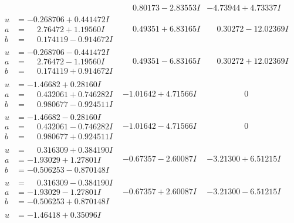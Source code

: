 \documentclass[1p]{elsarticle_modified}
\theoremstyle{definition}
\begin{document}
$$\begin{array}{c|c|c}
 & \phantom{-}0.80173 - 2.83553 I & -4.73944 + 4.73337 I \\ \hline\begin{aligned}
u &= -0.268706 + 0.441472 I \\
a &= \phantom{-}2.76472 + 1.19560 I \\
b &= \phantom{-}0.174119 - 0.914672 I\end{aligned}
 & \phantom{-}0.49351 + 6.83165 I & \phantom{-}0.30272 - 12.02369 I \\ \hline\begin{aligned}
u &= -0.268706 - 0.441472 I \\
a &= \phantom{-}2.76472 - 1.19560 I \\
b &= \phantom{-}0.174119 + 0.914672 I\end{aligned}
 & \phantom{-}0.49351 - 6.83165 I & \phantom{-}0.30272 + 12.02369 I \\ \hline\begin{aligned}
u &= -1.46682 + 0.28160 I \\
a &= \phantom{-}0.432061 + 0.746282 I \\
b &= \phantom{-}0.980677 - 0.924511 I\end{aligned}
 & -1.01642 + 4.71566 I & \phantom{-0.000000 } 0 \\ \hline\begin{aligned}
u &= -1.46682 - 0.28160 I \\
a &= \phantom{-}0.432061 - 0.746282 I \\
b &= \phantom{-}0.980677 + 0.924511 I\end{aligned}
 & -1.01642 - 4.71566 I & \phantom{-0.000000 } 0 \\ \hline\begin{aligned}
u &= \phantom{-}0.316309 + 0.384190 I \\
a &= -1.93029 + 1.27801 I \\
b &= -0.506253 - 0.870148 I\end{aligned}
 & -0.67357 - 2.60087 I & -3.21300 + 6.51215 I \\ \hline\begin{aligned}
u &= \phantom{-}0.316309 - 0.384190 I \\
a &= -1.93029 - 1.27801 I \\
b &= -0.506253 + 0.870148 I\end{aligned}
 & -0.67357 + 2.60087 I & -3.21300 - 6.51215 I \\ \hline\begin{aligned}
u &= -1.46418 + 0.35096 I \\

\end{aligned}
\end{array}$$
\end{document}
